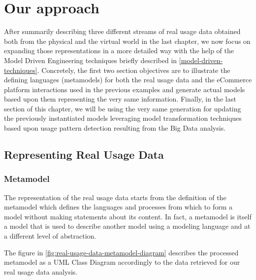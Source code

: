 \chead{}
\chapter{Our approach}

After summarily describing three different streams of real usage data obtained both from the physical and the virtual world in the last chapter, we now focus on expanding those representations in a more detailed way with the help of the Model Driven Engineering techniques briefly described in \ref{model-driven-techniques}. 
Concretely, the first two section objectives are to illustrate the defining languages (metamodels) for both the real usage data and the eCommerce platform interactions used in the previous examples and generate actual models based upon them representing the very same information.
Finally, in the last section of this chapter, we will be using the very same generation for updating the previously instantiated models leveraging model transformation techniques based upon usage pattern detection resulting from the Big Data analysis.

\section{Representing Real Usage Data}

\subsection{Metamodel}

The representation of the real usage data starts from the definition of the metamodel which defines the languages and processes from which to form a model without making statements about its content. In fact, a metamodel is itself a model that is used to describe another model using a modeling language and at a different level of abstraction.  

The figure in \ref{fig:real-usage-data-metamodel-diagram} describes the processed metamodel as a UML Class Diagram accordingly to the data retrieved for our real usage data analysis.

